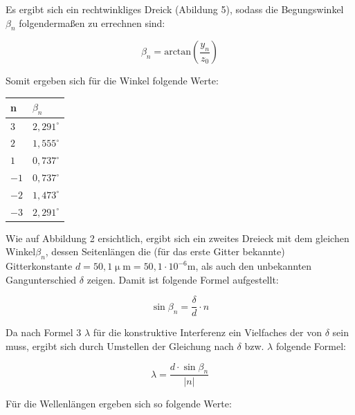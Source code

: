 \documentclass[12pt,a4paper,titlepage,headinclude,bibtotoc]{scrartcl}
\begin{document}
Es ergibt sich ein rechtwinkliges Dreick (Abildung 5), sodass die Begungswinkel $\beta_n$ folgendermaßen zu errechnen sind:

\begin{equation}
\beta_n = \mathrm {arctan} \left(\frac{y_n}{z_0}\right)
\end{equation}

\par

\vspace{2cm}

Somit ergeben sich für die Winkel folgende Werte: 

\begin{table} [h]
\centering
\begin{tabular}{|p{4 cm}||p{4 cm}|}
        \hline
		n& $\beta_n$\\
         \hline 
         $3$ & $2,291^\circ$  \\
         \hline
         $2$ & $1,555^\circ$\\
         \hline
         $1$ & $0,737^\circ$ \\
         \hline
         $-1$ & $0,737^\circ$ \\
         \hline
         $-2$ & $1,473^\circ$ \\
         \hline             
         $-3$ & $2,291^\circ$ \\
         \hline
\end{tabular}
\end{table}

Wie auf Abbildung 2 ersichtlich, ergibt sich ein zweites Dreieck mit dem gleichen Winkel$\beta_n$, dessen Seitenlängen die (für das erste Gitter bekannte)\\ Gitterkonstante $d= 50,1 \upmu \mathrm{m} =50,1\cdot10^{-6} \mathrm{m}$, als auch den unbekannten Gangunterschied $\delta$ zeigen. Damit ist folgende Formel aufgestellt:

\begin{equation}
\sin{\beta_n}=\frac{\delta}{d}\cdot n
\end{equation}

Da nach Formel 3 $\lambda$ für die konstruktive Interferenz ein Vielfaches der von $\delta$ sein muss, ergibt sich durch Umstellen der Gleichung nach $\delta$ bzw. $\lambda$ folgende Formel:

\begin{equation}
\lambda = \frac{d\cdot \sin\beta_n}{|n|}
\end{equation}

Für die Wellenlängen ergeben sich so folgende Werte:
\end{document}

